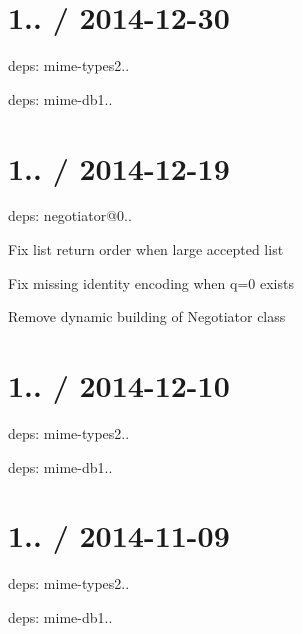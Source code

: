\section*{1.. / 2014-\/12-\/30 }


\begin{DoxyItemize}
\item deps\+: mime-\/types2..
\begin{DoxyItemize}
\item deps\+: mime-\/db1..
\end{DoxyItemize}
\end{DoxyItemize}

\section*{1.. / 2014-\/12-\/19 }


\begin{DoxyItemize}
\item deps\+: negotiator@0..
\begin{DoxyItemize}
\item Fix list return order when large accepted list
\item Fix missing identity encoding when q=0 exists
\item Remove dynamic building of Negotiator class
\end{DoxyItemize}
\end{DoxyItemize}

\section*{1.. / 2014-\/12-\/10 }


\begin{DoxyItemize}
\item deps\+: mime-\/types2..
\begin{DoxyItemize}
\item deps\+: mime-\/db1..
\end{DoxyItemize}
\end{DoxyItemize}

\section*{1.. / 2014-\/11-\/09 }


\begin{DoxyItemize}
\item deps\+: mime-\/types2..
\begin{DoxyItemize}
\item deps\+: mime-\/db1..
\end{DoxyItemize}
\end{DoxyItemize}

